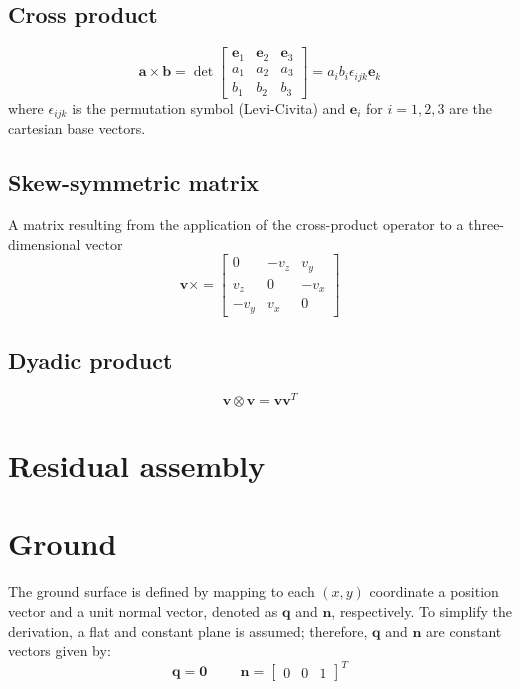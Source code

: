 \subsection*{Cross product}
\begin{equation}
    \mathbf{a} \times \mathbf{b} = \det\begin{bmatrix}
                                \mathbf{e}_1 & \mathbf{e}_2 & \mathbf{e}_3 \\
                                a_1 & a_2 & a_3 \\
                                b_1 & b_2 & b_3
                            \end{bmatrix} = a_i b_i \epsilon_{ijk} \mathbf{e}_k
\end{equation}
where $\epsilon_{ijk}$ is the permutation symbol (Levi-Civita) and $\mathbf{e}_i$ for $i = 1,2,3$ are the cartesian base vectors.
\subsection*{Skew-symmetric matrix}
A matrix resulting from the application of the cross-product operator to a three-dimensional
vector
\begin{equation}
    \mathbf{v} \times = \begin{bmatrix}
                                0 & -v_z & v_y \\
                                v_z & 0 & -v_x \\
                                -v_y & v_x & 0
                            \end{bmatrix}
\end{equation}
\subsection*{Dyadic product}
\begin{equation}
    \mathbf{v} \otimes \mathbf{v} = \mathbf{v}\mathbf{v}^T
\end{equation}
\section{Residual assembly}
\label{sec:residual}
\section{Ground}
The ground surface is defined by mapping to each $(x,y)$ coordinate a position vector and a unit normal vector, denoted as $\mathbf{q}$ and $\mathbf{n}$, respectively. To simplify the derivation, a flat and constant plane is assumed; therefore, $\mathbf{q}$ and $\mathbf{n}$ are constant vectors given by:
\begin{equation}
\label{eq:assumptions}
\mathbf{q} = \mathbf{0}\hspace{1cm}\mathbf{n} = \begin{bmatrix}
0 & 0 & 1
\end{bmatrix}^T
\end{equation}

